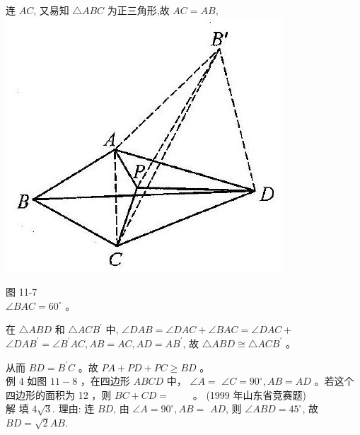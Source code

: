 \documentclass[10pt]{article}
\begin{document}
连 $A C$, 又易知 $\triangle A B C$ 为正三角形,故 $A C=A B$,\\
\includegraphics[max width=\textwidth, center]{2024_10_30_2c8f45efd4a519b08e1ag-105(2)}

图 11-7\\
$\angle B A C=60^{\circ}$ 。

在 $\triangle A B D$ 和 $\triangle A C B^{\prime}$ 中, $\angle D A B=\angle D A C+\angle B A C=\angle D A C+$ $\angle D A B^{\prime}=\angle B^{\prime} A C, A B=A C, A D=A B^{\prime}$, 故 $\triangle A B D \cong \triangle A C B^{\prime}$ 。

从而 $B D=B^{\prime} C$ 。故 $P A+P D+P C \geqslant B D$ 。\\
例 4 如图 $11-8$ ，在四边形 $A B C D$ 中， $\angle A=$ $\angle C=90^{\circ}, A B=A D$ 。若这个四边形的面积为 12 ，则 $B C+C D=$ $\qquad$。 (1999 年山东省竞赛题)\\
解 填 $4 \sqrt{3}$. 理由: 连 $B D$, 由 $\angle A=90^{\circ}, A B=$ $A D$, 则 $\angle A B D=45^{\circ}$, 故 $B D=\sqrt{2} A B$.
\end{document}
